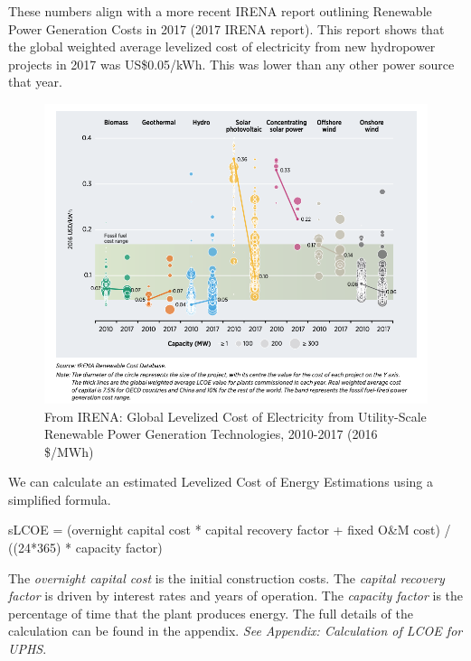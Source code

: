 \documentclass[hidelinks,12pt,a4paper]{article}
\begin{document}
These numbers align with a more recent IRENA report outlining Renewable Power Generation Costs in 2017 (2017 IRENA report). This report shows that the global weighted average levelized cost of electricity from new hydropower projects in 2017 was US\$0.05/kWh. This was lower than any other power source that year. \cite{RenewablePowerGenerationCostsIn2017}

\begin{figure}[ht!]
    \centering
    \includegraphics[width=1\textwidth]{renewable-power-generation-costs-in-2017.png}
    \caption{From IRENA: Global Levelized Cost of Electricity from Utility-Scale Renewable Power Generation Technologies, 2010-2017 (2016 \$/MWh) \cite{RenewablePowerGenerationCostsIn2017}}
\end{figure}
\FloatBarrier

We can calculate an estimated Levelized Cost of Energy Estimations using a simplified formula.

\begin{displayquote}
sLCOE = (overnight capital cost * capital recovery factor + fixed O\&M cost) / ((24*365) * capacity factor) \cite{SimpleLevelizedCostOfEnergyCalculator}
\end{displayquote}

The \textit{overnight capital cost} is the initial construction costs. The \textit{capital recovery factor} is driven by interest rates and years of operation. The \textit{capacity factor} is the percentage of time that the plant produces energy. The full details of the calculation can be found in the appendix. \textit{See Appendix: Calculation of LCOE for UPHS}.
\end{document}
